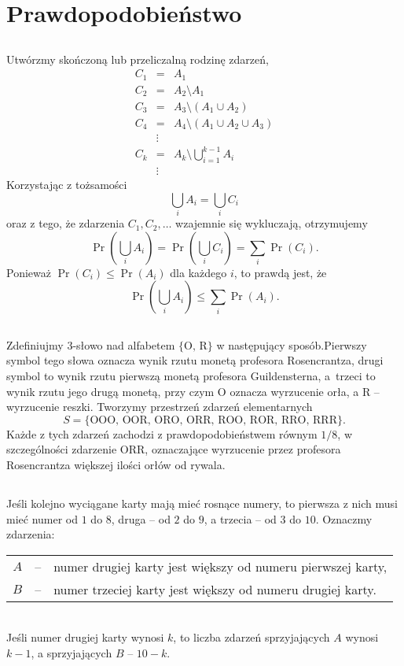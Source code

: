 \section{Prawdopodobieństwo}

\subsection{} %
Utwórzmy skończoną lub przeliczalną rodzinę zdarzeń,
\begin{eqnarray*}
	C_1 &=& A_1 \\
	C_2 &=& A_2\setminus A_1 \\
	C_3 &=& A_3\setminus (A_1\cup A_2) \\
	C_4 &=& A_4\setminus (A_1\cup A_2\cup A_3) \\
	& \vdots \\
	C_k &=& A_k\setminus \bigcup_{i=1}^{k-1}A_i \\
	& \vdots
\end{eqnarray*}
Korzystając z tożsamości
\[
	\bigcup_iA_i = \bigcup_iC_i
\]
oraz z tego, że zdarzenia $C_1,C_2,\dots$ wzajemnie się wykluczają, otrzymujemy
\[
	\Pr\left(\bigcup_iA_i\right) = \Pr\left(\bigcup_iC_i\right) = \sum_i\Pr(C_i).
\]
Ponieważ $\Pr(C_i)\le\Pr(A_i)$ dla każdego $i$, to prawdą jest, że
\[
	\Pr\left(\bigcup_iA_i\right)\le\sum_i\Pr(A_i).
\]

\subsection{} %
Zdefiniujmy $3$-słowo nad alfabetem $\{{\scriptstyle\mathrm{O},\,\mathrm{R}}\}$ w następujący sposób.\linebreak Pierwszy symbol tego słowa oznacza wynik rzutu monetą profesora Rosencrantza, drugi symbol to wynik rzutu pierwszą monetą profesora Guildensterna, a~trzeci to wynik rzutu jego drugą monetą, przy czym $\scriptstyle\mathrm{O}$ oznacza wyrzucenie orła, a $\scriptstyle\mathrm{R}$ -- wyrzucenie reszki. Tworzymy przestrzeń zdarzeń elementarnych
\[
	S = \{{\scriptstyle\mathrm{OOO},\,\mathrm{OOR},\,\mathrm{ORO},\,\mathrm{ORR},\,\mathrm{ROO},\,\mathrm{ROR},\,\mathrm{RRO},\,\mathrm{RRR}}\}.
\]
Każde z tych zdarzeń zachodzi z prawdopodobieństwem równym $1/8$, w szczególności zdarzenie $\scriptstyle\mathrm{ORR}$, oznaczające wyrzucenie przez profesora Rosencrantza większej ilości orłów od rywala.

\subsection{} %
Jeśli kolejno wyciągane karty mają mieć rosnące numery, to pierwsza z nich musi mieć numer od $1$ do $8$, druga -- od $2$ do $9$, a trzecia -- od $3$ do $10$. Oznaczmy zdarzenia: \\
\begin{tabular}{rcl}
	$A$ &--& numer drugiej karty jest większy od numeru pierwszej karty, \\
	$B$ &--& numer trzeciej karty jest większy od numeru drugiej karty.
\end{tabular}
\\
Jeśli numer drugiej karty wynosi $k$, to liczba zdarzeń sprzyjających $A$ wynosi $k-1$, a sprzyjających $B$ -- $10-k$.

